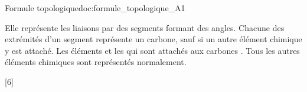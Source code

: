 \begin{doc}{Formule topologique}{doc:formule_topologique_A1}
  \begin{importants}  
    Elle représente les liaisons  par des segments formant des angles.
    Chacune des extrémités d'un segment représente un carbone, sauf si un autre élément chimique y est attaché.
    Les éléments  et les  qui sont attachés aux carbones .
    Tous les autres éléments chimiques sont représentés normalement.
  \end{importants}

  \exemple*
  \vspace*{-20pt}
  \begin{center}
    \qq{}
    \qq{}
  \end{center}
\end{doc}

[6]
